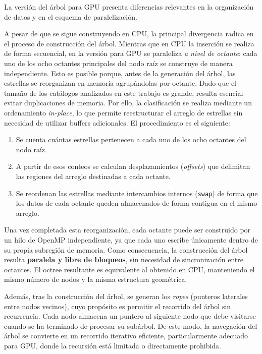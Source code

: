 La versión del árbol para GPU presenta diferencias relevantes en la organización de datos y en el esquema de paralelización.

A pesar de que se sigue construyendo en CPU, la principal divergencia radica en el proceso de construcción del árbol.
Mientras que en CPU la inserción se realiza de forma secuencial, en la versión para GPU se paraleliza \textit{a nivel de octante}: cada uno de los ocho octantes principales del nodo raíz se construye de manera independiente.
Esto es posible porque, antes de la generación del árbol, las estrellas se reorganizan en memoria agrupándolas por octante.
Dado que el tamaño de los catálogos analizados en este trabajo es grande, resulta esencial evitar duplicaciones de memoria.
Por ello, la clasificación se realiza mediante un ordenamiento \textit{in-place}, lo que permite reestructurar el arreglo de estrellas sin necesidad de utilizar buffers adicionales.
El procedimiento es el siguiente:
\begin{enumerate}
    \item Se cuenta cuántas estrellas pertenecen a cada uno de los ocho octantes del nodo raíz.
    \item A partir de esos conteos se calculan desplazamientos (\textit{offsets}) que delimitan las regiones del arreglo destinadas a cada octante.
    \item Se reordenan las estrellas mediante intercambios internos (\texttt{swap}) de forma que los datos de cada octante queden almacenados de forma contigua en el mismo arreglo.
\end{enumerate}

Una vez completada esta reorganización, cada octante puede ser construido por un hilo de OpenMP independiente, ya que cada uno escribe únicamente dentro de su propia subregión de memoria.
Como consecuencia, la construcción del árbol resulta \textbf{paralela y libre de bloqueos}, sin necesidad de sincronización entre octantes.
El octree resultante es equivalente al obtenido en CPU, manteniendo el mismo número de nodos y la misma estructura geométrica.

Además, tras la construcción del árbol, se generan los \textit{ropes} (punteros laterales entre nodos vecinos), cuyo propósito es permitir el recorrido del árbol sin recurrencia.
Cada nodo almacena un puntero al siguiente nodo que debe visitarse cuando se ha terminado de procesar su subárbol.
De este modo, la navegación del árbol se convierte en un recorrido iterativo eficiente, particularmente adecuado para GPU, donde la recursión está limitada o directamente prohibida.


